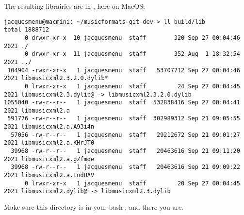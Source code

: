 The resulting librairies are in , here on MacOS:
\begin{lstlisting}[language=Terminal]
jacquesmenu@macmini: ~/musicformats-git-dev > ll build/lib
total 1888712
      0 drwxr-xr-x  10 jacquesmenu  staff        320 Sep 27 00:04:46 2021 ./
      0 drwxr-xr-x  11 jacquesmenu  staff        352 Aug  1 18:32:54 2021 ../
 104904 -rwxr-xr-x   1 jacquesmenu  staff   53707712 Sep 27 00:04:46 2021 libmusicxml2.3.2.0.dylib*
      0 lrwxr-xr-x   1 jacquesmenu  staff         24 Sep 27 00:04:45 2021 libmusicxml2.3.dylib@ -> libmusicxml2.3.2.0.dylib
1055040 -rw-r--r--   1 jacquesmenu  staff  532838416 Sep 27 00:04:41 2021 libmusicxml2.a
 591776 -rw-r--r--   1 jacquesmenu  staff  302989312 Sep 21 09:05:55 2021 libmusicxml2.a.A93i4n
  57056 -rw-r--r--   1 jacquesmenu  staff   29212672 Sep 21 09:01:27 2021 libmusicxml2.a.KHrJT0
  39968 -rw-r--r--   1 jacquesmenu  staff   20463616 Sep 21 09:11:20 2021 libmusicxml2.a.gZfmqe
  39968 -rw-r--r--   1 jacquesmenu  staff   20463616 Sep 21 09:09:22 2021 libmusicxml2.a.tndUAV
      0 lrwxr-xr-x   1 jacquesmenu  staff         20 Sep 27 00:04:45 2021 libmusicxml2.dylib@ -> libmusicxml2.3.dylib
\end{lstlisting}

Make sure this  directory is in your bash , and there you are.

